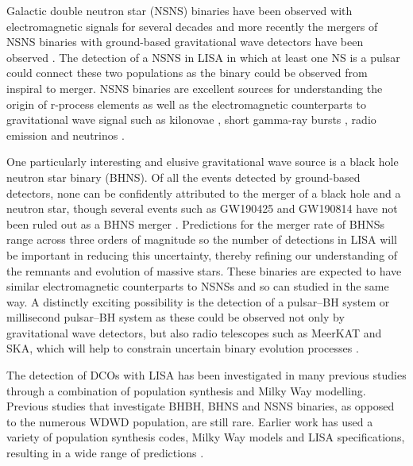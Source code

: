Galactic double neutron star (NSNS) binaries have been observed with electromagnetic signals for several decades \citep[e.g.][]{Hulse+1975} and more recently the mergers of NSNS binaries with ground-based gravitational wave detectors have been observed \citep[e.g.][]{Abbott+2017_NSNS}. The detection of a NSNS in LISA in which at least one NS is a pulsar could connect these two populations as the binary could be observed from inspiral to merger. NSNS binaries are excellent sources for understanding the origin of r-process elements \citep[e.g.][]{Eichler+1989} as well as the electromagnetic counterparts to gravitational wave signal such as kilonovae \citep[e.g.][]{Metzger+2017}, short gamma-ray bursts \citep[e.g.][]{Gompertz+2020}, radio emission \citep[e.g.][]{Hotokezaka+2016} and neutrinos \citep[e.g.][]{Kyutoku+2018}.

One particularly interesting and elusive gravitational wave source is a black hole neutron star binary (BHNS). Of all the events detected by ground-based detectors, none can be confidently attributed to the merger of a black hole and a neutron star, though several events such as GW190425 and GW190814 have not been ruled out as a BHNS merger \citep{Abbott+2020_GW190425,Abbott+2020_GW190814}. Predictions for the merger rate of BHNSs range across three orders of magnitude \citep[e.g.][]{Broekgaarden+2021} so the number of detections in LISA will be important in reducing this uncertainty, thereby refining our understanding of the remnants and evolution of massive stars. These binaries are expected to have similar electromagnetic counterparts to NSNSs and so can studied in the same way. A distinctly exciting possibility is the detection of a pulsar--BH system or millisecond pulsar--BH system as these could be observed not only by gravitational wave detectors, but also radio telescopes such as MeerKAT and SKA, which will help to constrain uncertain binary evolution processes \citep{Chattopadhyay+2020}.

The detection of DCOs with LISA has been investigated in many previous studies through a combination of population synthesis and Milky Way modelling. Previous studies that investigate BHBH, BHNS and NSNS binaries, as opposed to the numerous WDWD population, are still rare. Earlier work has used a variety of population synthesis codes, Milky Way models and LISA specifications, resulting in a wide range of predictions \citep{Nelemans+2001,Liu+2009,Belczynski+2010,Liu+2014,Lamberts+2019,Lau+2020,Breivik+2020,Sesana+2020}.

